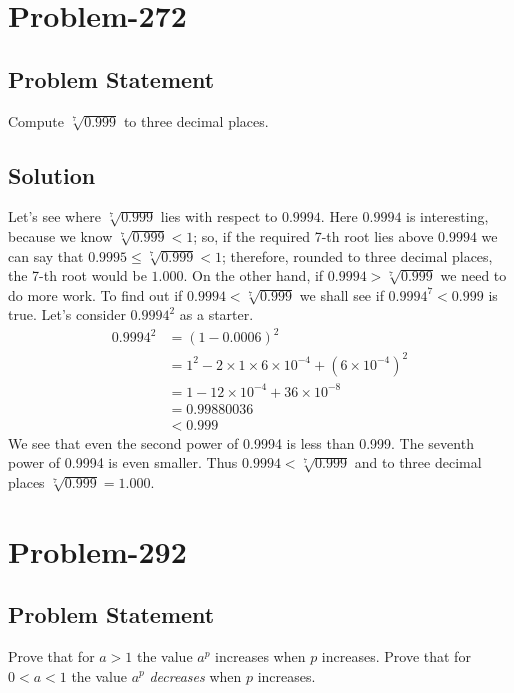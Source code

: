 \documentclass[12pt]{article}
\begin{document}
\section*{Problem-272}
\subsection*{Problem Statement}
Compute $\sqrt[7]{0.999}$ to three decimal places.

\subsection*{Solution}
Let's see where $\sqrt[7]{0.999}$ lies with respect to $0.9994$. Here $0.9994$ is interesting, because we know $\sqrt[7]{0.999} < 1$; so, if the required 7-th root lies above $0.9994$ we can say that $0.9995 \leq \sqrt[7]{0.999} < 1$; therefore, rounded to three decimal places, the 7-th root would be $1.000$. On the other hand, if $0.9994 > \sqrt[7]{0.999}$ we need to do more work. To find out if $0.9994 < \sqrt[7]{0.999}$ we shall see if $0.9994^7 < 0.999$ is true. Let's consider $0.9994^2$ as a starter.
\begin{equation*}
	\begin{aligned}
		0.9994^2 &= (1-0.0006)^2\\
		         &= 1^2 - 2 \times 1 \times 6 \times 10^{-4} + \left( 6 \times 10^{-4} \right)^2\\
		         &= 1 - 12 \times 10^{-4} + 36 \times 10^{-8}\\
		         &= 0.99880036\\
		         &< 0.999
	\end{aligned}
\end{equation*}
We see that even the second power of 0.9994 is less than 0.999. The seventh power of 0.9994 is even smaller. Thus $0.9994 < \sqrt[7]{0.999}$ and to three decimal places $\sqrt[7]{0.999} = 1.000$.

\section*{Problem-292}
\subsection*{Problem Statement}
Prove that for $a > 1$ the value $a^p$ increases when $p$ increases. Prove that for $0 < a < 1$ the value $a^p$ \emph{decreases} when $p$ increases.
\end{document}
